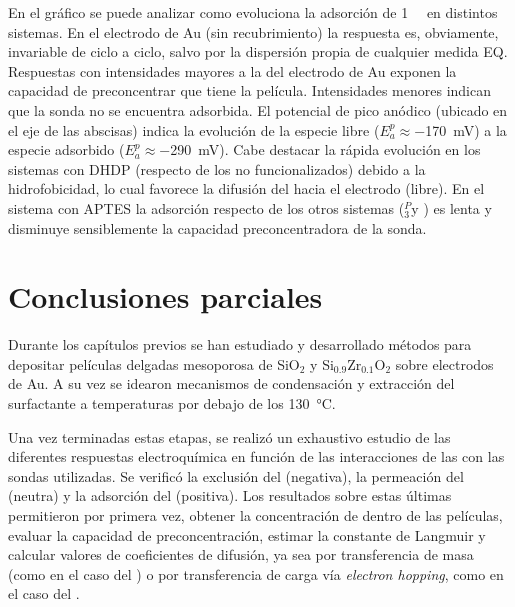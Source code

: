 	 	 En el gráfico se puede analizar como evoluciona la adsorción de \ru\space \SI{1}{\milli\Molar} en distintos sistemas. En el electrodo de Au (sin recubrimiento) la respuesta es, obviamente, invariable de ciclo a ciclo, salvo por la dispersión propia de cualquier medida EQ. Respuestas con intensidades mayores a la del electrodo de Au exponen la capacidad de preconcentrar que tiene la película. Intensidades menores indican que la sonda no se encuentra adsorbida. El potencial de pico anódico (ubicado en el eje de las abscisas) indica la evolución de la especie \ru\space libre ($E^p_{a}\approx$\SI{-170}{\milli\volt}) a la especie \ru\space adsorbido ($E^p_{a}\approx$\SI{-290}{\milli\volt}). Cabe destacar la rápida evolución en los sistemas con DHDP (respecto de los no funcionalizados) debido a la hidrofobicidad, lo cual favorece la difusión del \ru\space hacia el electrodo (\ru\space libre). En el sistema con APTES la adsorción respecto de los otros sistemas (\pdmZ$^P_3$\space y \pdmZ) es lenta y disminuye sensiblemente la capacidad preconcentradora de la sonda.



\section{Conclusiones parciales}
	
	Durante los capítulos previos se han estudiado y desarrollado métodos para depositar películas delgadas mesoporosa de SiO$_2$ y Si$_{0.9}$Zr$_{0.1}$O$_2$  sobre electrodos de Au. A su vez se idearon mecanismos de condensación y extracción del surfactante a temperaturas por debajo de los \SI{130}{\celsius}. 

	Una vez terminadas estas etapas, se realizó un exhaustivo estudio de las diferentes respuestas electroquímica en función de las interacciones de las \pdm\space con las sondas utilizadas. Se verificó la exclusión del \ferroferri\space (negativa), la permeación del \fc\space (neutra) y la adsorción del \aminorutenio\space (positiva). Los resultados sobre estas últimas permitieron por primera vez, obtener la concentración de \ru\space dentro de las películas, evaluar la capacidad de preconcentración, estimar la constante de Langmuir y calcular valores de coeficientes de difusión, ya sea por transferencia de masa (como en el caso del \fc) o por transferencia de carga vía \textit{electron hopping}, como en el caso del \ru.

